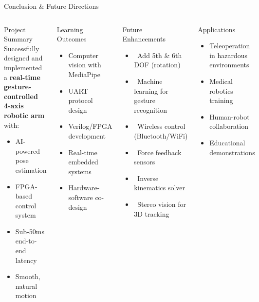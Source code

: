 \documentclass[aspectratio=169]{beamer}
\begin{document}
\begin{frame}{Conclusion \& Future Directions}
\begin{columns}
\begin{block}{Project Summary}
Successfully designed and implemented a \textbf{real-time gesture-controlled 4-axis robotic arm} with:
\begin{itemize}
    \item AI-powered pose estimation
    \item FPGA-based control system
    \item Sub-50ms end-to-end latency
    \item Smooth, natural motion
\end{itemize}
\end{block}

\begin{block}{Learning Outcomes}
\begin{itemize}
    \item Computer vision with MediaPipe
    \item UART protocol design
    \item Verilog/FPGA development
    \item Real-time embedded systems
    \item Hardware-software co-design
\end{itemize}
\end{block}

\begin{alertblock}{Future Enhancements}
\begin{itemize}
    \item \faPlus\ Add 5th \& 6th DOF (rotation)
    \item \faBrain\ Machine learning for gesture recognition
    \item \faWifi\ Wireless control (Bluetooth/WiFi)
    \item \faChartLine\ Force feedback sensors
    \item \faCogs\ Inverse kinematics solver
    \item \faVideo\ Stereo vision for 3D tracking
\end{itemize}
\end{alertblock}

\begin{exampleblock}{Applications}
\begin{itemize}
    \item Teleoperation in hazardous environments
    \item Medical robotics training
    \item Human-robot collaboration
    \item Educational demonstrations
\end{itemize}
\end{exampleblock}
\end{columns}


\end{frame}
\end{document}
